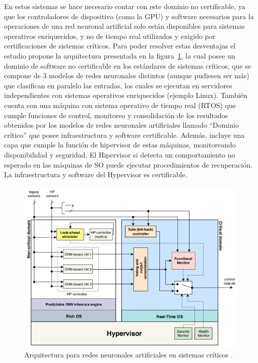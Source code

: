 En estos sistemas se hace necesario contar con este dominio no certificable, ya que los controladores de dispositivo (como la GPU) y software necesarios para la operaciones de una red neuronal artificial solo están disponibles para sistemas operativos enriquecidos, y no de tiempo real utilizados y exigido por certificaciones de sistemas críticos. Para poder resolver estas desventajas el estudio propone la arquitectura presentada en la figura~\ref{fig:35}, la cual posee un dominio de software no certificable en los estándares de sistemas críticos, que se compone de 3 modelos de redes neuronales distintos (aunque pudiesen ser más) que clasifican en paralelo las entradas, los cuales se ejecutan en servidores independientes con sistemas operativos enriquecidos (ejemplo Linux). También cuenta con una máquina con sistema operativo de tiempo real (RTOS) que cumple funciones de control, monitoreo y consolidación de los resultados obtenidos por los modelos de redes neuronales artificiales llamado “Dominio crítico” que posee infraestructura y software certificable. Además, incluye una capa que cumple la función de hipervisor de estas máquinas, monitoreando disponibilidad y seguridad. El Hipervisor si detecta un comportamiento no esperado en las máquinas de SO puede ejecutar procedimientos de recuperación. La infraestructura y software del Hypervisor es certificable.

\begin{figure}[th]
\centering
\includegraphics{Figures/figura_35.PNG}
\decoRule
\caption[Arquitectura para redes neuronales artificiales en sistemas críticos]{Arquitectura para redes neuronales artificiales en sistemas críticos \parencite{r5}.}
\label{fig:35}
\end{figure}

